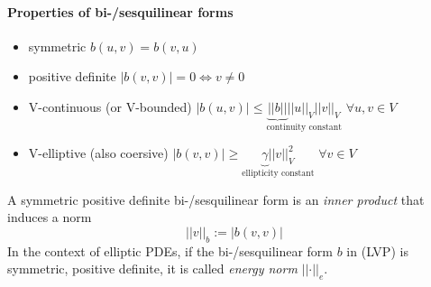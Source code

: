 \documentclass[ngerman]{article}
\theoremstyle{definition}
\theoremstyle{remark}
\begin{document}
\paragraph{Properties of bi-/sesquilinear forms}
\begin{itemize}
\item symmetric $b\left(u,v\right)=b\left(v,u\right)$
\item positive definite $\left|b\left(v,v\right)\right|=0\iff v\neq0$
\item V-continuous (or V-bounded) $\left|b\left(u,v\right)\right|\le\underset{\mbox{continuity constant}}{\underbrace{\left|\left|b\right|\right|}\left|\left|u\right|\right|_{V}\left|\left|v\right|\right|_{V}}$
  $\forall u,v\in V$
\item V-elliptive (also coersive) $\left|b\left(v,v\right)\right|\ge\underset{\mbox{ellipticity constant}}{\underbrace{\gamma}\left|\left|v\right|\right|_{V}^{2}}$
  $\forall v\in V$
\end{itemize}
A symmetric positive definite bi-/sesquilinear form is an \emph{inner
  product} that induces a norm
\[
\left|\left|v\right|\right|_{b}:=\left|b\left(v,v\right)\right|
\]
In the context of elliptic PDEs, if the bi-/sesquilinear form $b$
in (LVP) is symmetric, positive definite, it is called \emph{energy
  norm} $\left|\left|\cdot\right|\right|_{e}$.

\end{document}
